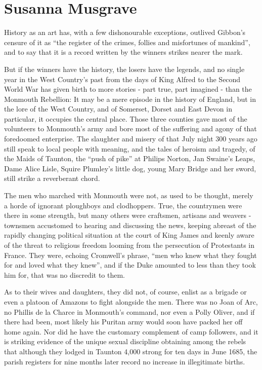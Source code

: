 \chapter{Susanna Musgrave}
	
History as an art has, with a few dishonourable exceptions, outlived Gibbon’s censure of it as “the register of the crimes, follies and misfortunes of mankind”, and to say that it is a record written by the winners strikes nearer the mark.

But if the winners have the history, the losers have the legends, and no single year in the West Country’s past from the days of King Alfred to the Second World War has given birth to more stories - part true, part imagined - than the Monmouth Rebellion: It may be a mere episode in the history of England, but in the lore of the West Country, and of Somerset, Dorset and East Devon in particular, it occupies the central place. Those three counties gave most of the volunteers to Monmouth’s army and bore most of the suffering and agony of that foredoomed enterprise. The slaughter and misery of that July night 300 years ago still speak to local people with meaning, and the tales of heroism and tragedy, of the Maids of Taunton, the “push of pike” at Philips Norton, Jan Swaine’s Leaps, Dame Alice Lisle, Squire Plumley’s little dog, young Mary Bridge and her sword, still strike a reverberant chord.

The men who marched with Monmouth were not, as used to be thought, merely a horde of ignorant ploughboys and clodhoppers. True, the countrymen were there in some strength, but many others were craftsmen, artisans and weavers - townsmen accustomed to hearing and discussing the news, keeping abreast of the rapidly changing political situation at the court of King James and keenly aware of the threat to religious freedom looming from the persecution of Protestants in France. They were, echoing Cromwell’s phrase, “men who knew what they fought for and loved what they knew”, and if the Duke amounted to less than they took him for, that was no discredit to them.

As to their wives and daughters, they did not, of course, enlist as a brigade or even a platoon of Amazons to fight alongside the men. There was no Joan of Arc, no Phillis de la Charce in Monmouth’s command, nor even a Polly Oliver, and if there had been, most likely his Puritan army would soon have packed her off home again. Nor did he have the customary complement of camp followers, and it is striking evidence of the unique sexual discipline obtaining among the rebels that although they lodged in Taunton 4,000 strong for ten days in June 1685, the parish registers for nine months later record no increase in illegitimate births.

